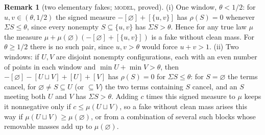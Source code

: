 \documentclass[11pt,reqno]{amsart}
\theoremstyle{definition}
\newtheorem{remark}[theorem]{Remark}
\newcommand{\status}[1]{\textup{\textsc{#1}}}
\begin{document}
\begin{remark}[two elementary fakes; \status{model}, proved]\label{rem:blockfake}
(i) One window, $\theta<1/2$: for $u,v\in(\theta,1/2)$ the signed measure
$-[\varnothing]+[\{u,v\}]$ has $\rho(S)=0$ whenever $\Sigma S\le\theta$, since
every nonempty $S\subseteq\{u,v\}$ has $\Sigma S>\theta$.  Hence for any
true law $\mu$ the measure $\mu+\mu(\varnothing)(-[\varnothing]+[\{u,v\}])$ is a
fake without clean mass.  For $\theta\ge1/2$ there is no such pair, since
$u,v>\theta$ would force $u+v>1$.
(ii) Two windows: if $U,V$ are disjoint nonempty configurations, each with
an even number of points in each window and $\min U+\min V>\theta$, then
$-[\varnothing]-[U\sqcup V]+[U]+[V]$ has $\rho(S)=0$ for $\Sigma S\le\theta$:
for $S=\varnothing$ the terms cancel, for $\varnothing\ne S\subseteq U$ (or
$\subseteq V$) the two terms containing $S$ cancel, and an $S$ meeting both
$U$ and $V$ has $\Sigma S>\theta$.  Adding $c$ times this signed measure to
$\mu$ keeps it nonnegative only if $c\le\mu(U\sqcup V)$, so a fake without
clean mass arises this way if $\mu(U\sqcup V)\ge\mu(\varnothing)$, or from a
combination of several such blocks whose removable masses add up to
$\mu(\varnothing)$.
\end{remark}
\end{document}
